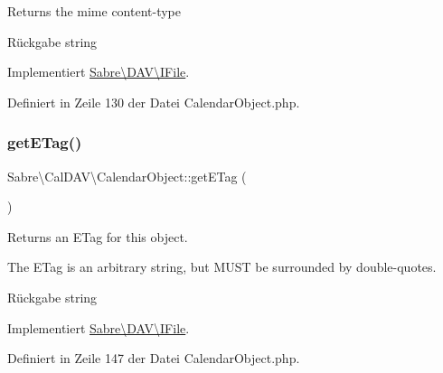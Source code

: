 Returns the mime content-\/type

\begin{DoxyReturn}{Rückgabe}
string 
\end{DoxyReturn}


Implementiert \mbox{\hyperlink{interface_sabre_1_1_d_a_v_1_1_i_file_aa76147e3e0ad228026dcb03035b499bc}{Sabre\textbackslash{}\+D\+A\+V\textbackslash{}\+I\+File}}.



Definiert in Zeile 130 der Datei Calendar\+Object.\+php.

\mbox{\label{class_sabre_1_1_cal_d_a_v_1_1_calendar_object_a8cbcfda4ad2f5d8ef67a7fb11ca4ea07}} 
\subsubsection{\texorpdfstring{get\+E\+Tag()}{getETag()}}
{\footnotesize\ttfamily Sabre\textbackslash{}\+Cal\+D\+A\+V\textbackslash{}\+Calendar\+Object\+::get\+E\+Tag (\begin{DoxyParamCaption}{ }\end{DoxyParamCaption})}

Returns an E\+Tag for this object.

The E\+Tag is an arbitrary string, but M\+U\+ST be surrounded by double-\/quotes.

\begin{DoxyReturn}{Rückgabe}
string 
\end{DoxyReturn}


Implementiert \mbox{\hyperlink{interface_sabre_1_1_d_a_v_1_1_i_file_a2b207a6037dcbd4e7373b977dc60117f}{Sabre\textbackslash{}\+D\+A\+V\textbackslash{}\+I\+File}}.



Definiert in Zeile 147 der Datei Calendar\+Object.\+php.

\mbox{\label{class_sabre_1_1_cal_d_a_v_1_1_calendar_object_af38c4e426495f55a2222b5413f7b388b}} 

